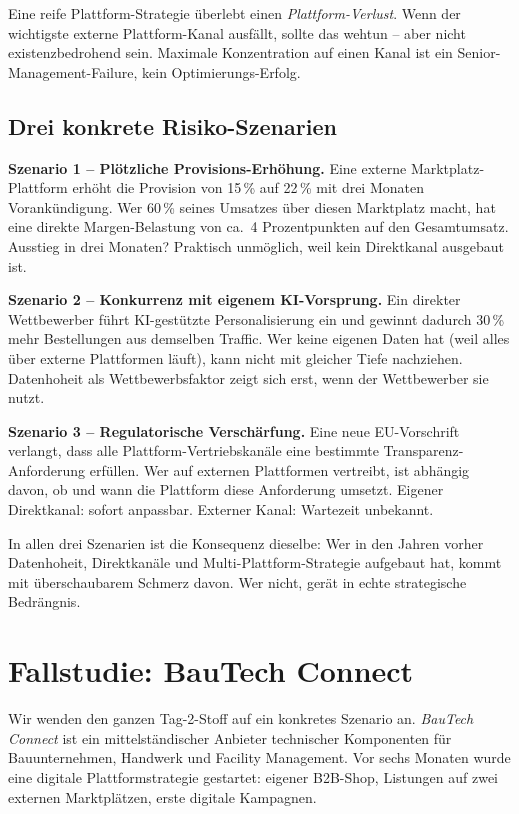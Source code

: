 \documentclass[11pt,a4paper,oneside]{article}
\begin{document}
\begin{merkbox}
Eine reife Plattform-Strategie überlebt einen \emph{Plattform-Verlust}. Wenn der wichtigste externe Plattform-Kanal ausfällt, sollte das wehtun -- aber nicht existenzbedrohend sein. Maximale Konzentration auf einen Kanal ist ein Senior-Management-Failure, kein Optimierungs-Erfolg.
\end{merkbox}

\subsection{Drei konkrete Risiko-Szenarien}

\textbf{Szenario 1 -- Plötzliche Provisions-Erhöhung.} Eine externe Marktplatz-Plattform erhöht die Provision von 15\,\% auf 22\,\% mit drei Monaten Vorankündigung. Wer 60\,\% seines Umsatzes über diesen Marktplatz macht, hat eine direkte Margen-Belastung von ca.\ 4 Prozentpunkten auf den Gesamtumsatz. Ausstieg in drei Monaten? Praktisch unmöglich, weil kein Direktkanal ausgebaut ist.

\textbf{Szenario 2 -- Konkurrenz mit eigenem KI-Vorsprung.} Ein direkter Wettbewerber führt KI-gestützte Personalisierung ein und gewinnt dadurch 30\,\% mehr Bestellungen aus demselben Traffic. Wer keine eigenen Daten hat (weil alles über externe Plattformen läuft), kann nicht mit gleicher Tiefe nachziehen. Datenhoheit als Wettbewerbsfaktor zeigt sich erst, wenn der Wettbewerber sie nutzt.

\textbf{Szenario 3 -- Regulatorische Verschärfung.} Eine neue EU-Vorschrift verlangt, dass alle Plattform-Vertriebskanäle eine bestimmte Transparenz-Anforderung erfüllen. Wer auf externen Plattformen vertreibt, ist abhängig davon, ob und wann die Plattform diese Anforderung umsetzt. Eigener Direktkanal: sofort anpassbar. Externer Kanal: Wartezeit unbekannt.

In allen drei Szenarien ist die Konsequenz dieselbe: Wer in den Jahren vorher Datenhoheit, Direktkanäle und Multi-Plattform-Strategie aufgebaut hat, kommt mit überschaubarem Schmerz davon. Wer nicht, gerät in echte strategische Bedrängnis.

\section{Fallstudie: BauTech Connect}

Wir wenden den ganzen Tag-2-Stoff auf ein konkretes Szenario an. \emph{BauTech Connect} ist ein mittelständischer Anbieter technischer Komponenten für Bauunternehmen, Handwerk und Facility Management. Vor sechs Monaten wurde eine digitale Plattform­strategie gestartet: eigener B2B-Shop, Listungen auf zwei externen Marktplätzen, erste digitale Kampagnen.
\end{document}
